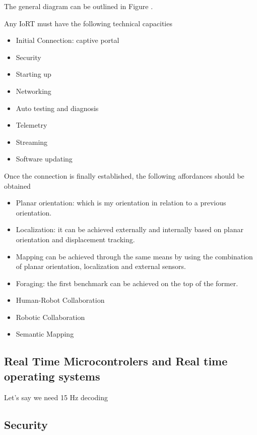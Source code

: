 The general diagram can be outlined in Figure .

Any IoRT must have the following technical capacities

\begin{itemize}
\item Initial Connection: captive portal
\item Security
\item Starting up
\item Networking
\item Auto testing and diagnosis
\item Telemetry
\item Streaming
\item Software updating
\end{itemize}

Once the connection is finally established, the following affordances should be obtained

\begin{itemize}
\item Planar orientation: which is my orientation in relation to a previous orientation.
\item Localization: it can be achieved externally and internally based on planar orientation and displacement tracking.
\item Mapping can be achieved through the same means by using the combination of planar orientation, localization and external sensors.
\end{itemize}


\begin{itemize}
\item Foraging: the first benchmark can be achieved on the top of the former.
\item Human-Robot Collaboration
\item Robotic Collaboration
\item Semantic Mapping
\end{itemize}

\subsection{Real Time Microcontrolers and Real time operating systems}

Let's say we need 15 Hz decoding 

\subsection{Security}

